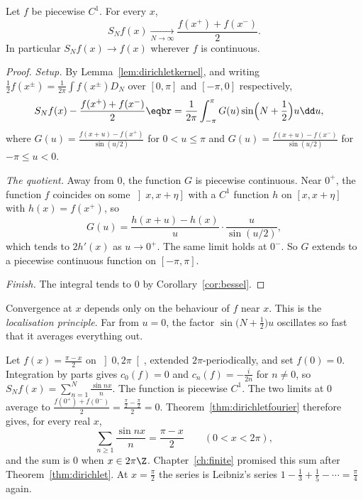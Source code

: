 \begin{theorem}[Dirichlet, 1829]\label{thm:dirichletfourier}
Let $f$ be piecewise $C^1$. For every $x$,
\[
S_Nf(x)\xrightarrow[N\to\infty]{}\frac{f(x^+)+f(x^-)}2.
\]
In particular $S_Nf(x)\to f(x)$ wherever $f$ is continuous.
\end{theorem}
\begin{proof}
\emph{Setup.} By Lemma~\ref{lem:dirichletkernel}, and writing $\frac12f(x^\pm)=\frac1{2\pi}\int f(x^\pm)D_N$ over $[0,\pi]$ and $[-\pi,0]$ respectively,
\[
\begin{aligned}S_Nf(x)&-\frac{f(x^+)+f(x^-)}2\eqbr=\frac1{2\pi}\int_{-\pi}^\pi G(u)\sin\Bigl(N+\frac12\Bigr)u\dd u,\end{aligned}
\]
where $G(u)=\frac{f(x+u)-f(x^+)}{\sin(u/2)}$ for $0<u\le\pi$ and $G(u)=\frac{f(x+u)-f(x^-)}{\sin(u/2)}$ for $-\pi\le u<0$.

\emph{The quotient.} Away from $0$, the function $G$ is piecewise continuous. Near $0^+$, the function $f$ coincides on some $\left]x,x+\eta\right]$ with a $C^1$ function $h$ on $[x,x+\eta]$ with $h(x)=f(x^+)$, so
\[
G(u)=\frac{h(x+u)-h(x)}u\cdot\frac u{\sin(u/2)},
\]
which tends to $2h'(x)$ as $u\to0^+$. The same limit holds at $0^-$. So $G$ extends to a piecewise continuous function on $[-\pi,\pi]$.

\emph{Finish.} The integral tends to $0$ by Corollary~\ref{cor:bessel}.
\end{proof}

Convergence at $x$ depends only on the behaviour of $f$ near $x$. This is the \emph{localisation principle}. Far from $u=0$, the factor $\sin\bigl(N+\frac12\bigr)u$ oscillates so fast that it averages everything out.

\begin{example}\label{ex:sawtooth}
Let $f(x)=\frac{\pi-x}2$ on $\left]0,2\pi\right[$, extended $2\pi$-periodically, and set $f(0)=0$. Integration by parts gives $c_0(f)=0$ and $c_n(f)=-\frac i{2n}$ for $n\ne0$, so $S_Nf(x)=\sum_{n=1}^N\frac{\sin nx}n$. The function is piecewise $C^1$. The two limits at $0$ average to $\frac{f(0^+)+f(0^-)}2=\frac{\frac\pi2-\frac\pi2}2=0$. Theorem~\ref{thm:dirichletfourier} therefore gives, for every real $x$,
\[
\sum_{n\ge1}\frac{\sin nx}n=\frac{\pi-x}2\qquad(0<x<2\pi),
\]
and the sum is $0$ when $x\in2\pi\Z$.
Chapter~\ref{ch:finite} promised this sum after Theorem~\ref{thm:dirichlet}. At $x=\frac\pi2$ the series is Leibniz's series $1-\frac13+\frac15-\cdots=\frac\pi4$ again.
\end{example}

